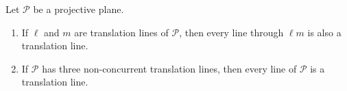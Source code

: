 Let $\mathcal{P}$ be a projective plane.
\begin{enumerate}
\item[(a)] If $\ell$ and $m$ are translation lines of $\mathcal{P}$, then every line through $\ell m$ is also a translation line.
\item[(b)] If $\mathcal{P}$ has three non-concurrent translation lines, then every line of $\mathcal{P}$ is a translation line.
\end{enumerate}

